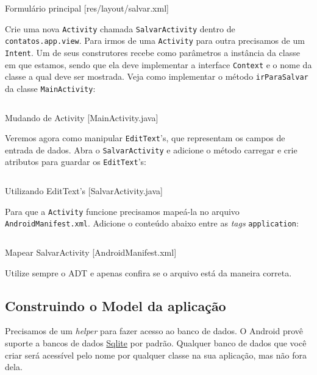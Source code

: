 \begin{listing}[H]
  \inputminted[linenos=true,frame=bottomline,tabsize=3]{ xml }{ source/salvar-1.xml }
  \caption{Formulário principal [res/layout/salvar.xml]}
\end{listing}

Crie uma nova \texttt{Activity} chamada \texttt{SalvarActivity} dentro
de \texttt{contatos.app.view}. Para irmos de uma \texttt{Activity} para
outra precisamos de um \texttt{Intent}. Um de seus construtores recebe
como parâmetros a instância da classe em que estamos, sendo que ela deve
implementar a interface \texttt{Context} e o nome da classe a qual deve
ser mostrada. Veja como implementar o método \texttt{irParaSalvar} da
classe \texttt{MainActivity}:

\begin{listing}[H]
  \inputminted[linenos=true,frame=bottomline,tabsize=3]{ java }{ source/MainActivity-3.java }
  \caption{Mudando de Activity [MainActivity.java]}
\end{listing}

Veremos agora como manipular \texttt{EditText}'s, que representam os
campos de entrada de dados. Abra o \texttt{SalvarActivity} e adicione o
método carregar e crie atributos para guardar os \texttt{EditText}'s:

\begin{listing}[H]
  \inputminted[linenos=true,frame=bottomline,tabsize=3]{ java }{ source/SalvarActivity-1.java }
  \caption{Utilizando EditText's [SalvarActivity.java]}
\end{listing}

Para que a \texttt{Activity} funcione precisamos mapeá-la no arquivo
\texttt{AndroidManifest.xml}. Adicione o conteúdo abaixo entre as
\emph{tags} \texttt{application}:

\begin{listing}[H]
  \inputminted[linenos=true,frame=bottomline,tabsize=3]{ xml }{ source/AndroidManifest-2.xml }
  \caption{Mapear SalvarActivity [AndroidManifest.xml]}
\end{listing}

Utilize sempre o ADT e apenas confira se o arquivo está da maneira
correta.

\subsection{Construindo o Model da aplicação \label{ssec:model}}

Precisamos de um \emph{helper} para fazer acesso ao banco de dados. O
Android provê suporte a bancos de dados
\href{http://sqlite.org/}{Sqlite} por padrão. Qualquer banco de dados
que você criar será acessível pelo nome por qualquer classe na sua
aplicação, mas não fora dela.

